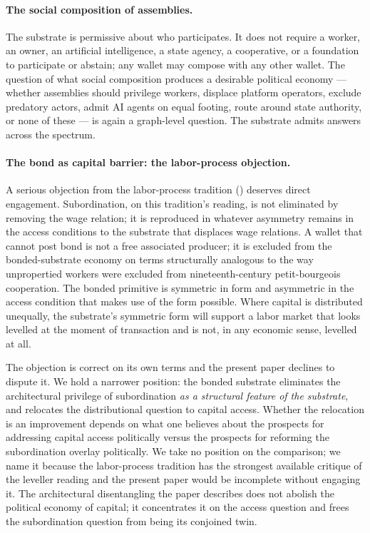 \documentclass[11pt,a4paper]{article}
\theoremstyle{remark}
\begin{document}
\paragraph{The social composition of assemblies.}
The substrate is permissive about who participates. It does not
require a worker, an owner, an artificial intelligence, a state
agency, a cooperative, or a foundation to participate or
abstain; any wallet may compose with any other wallet. The
question of what social composition produces a desirable
political economy --- whether assemblies should privilege
workers, displace platform operators, exclude predatory actors,
admit AI agents on equal footing, route around state authority,
or none of these --- is again a graph-level question. The
substrate admits answers across the spectrum.

\paragraph{The bond as capital barrier: the labor-process objection.}
A serious objection from the labor-process tradition
(\citealt{braverman1974labor, burawoy1979manufacturing}) deserves
direct engagement. Subordination, on this tradition's reading,
is not eliminated by removing the wage relation; it is reproduced
in whatever asymmetry remains in the access conditions to the
substrate that displaces wage relations. A wallet that cannot
post bond is not a free associated producer; it is excluded from
the bonded-substrate economy on terms structurally analogous to
the way unpropertied workers were excluded from
nineteenth-century petit-bourgeois cooperation. The bonded
primitive is symmetric in form and asymmetric in the access
condition that makes use of the form possible. Where capital is
distributed unequally, the substrate's symmetric form will
support a labor market that looks levelled at the moment of
transaction and is not, in any economic sense, levelled at all.

The objection is correct on its own terms and the present paper
declines to dispute it. We hold a narrower position: the bonded
substrate eliminates the architectural privilege of subordination
\emph{as a structural feature of the substrate}, and relocates
the distributional question to capital access. Whether the
relocation is an improvement depends on what one believes about
the prospects for addressing capital access politically versus
the prospects for reforming the subordination overlay
politically. We take no position on the comparison; we name it
because the labor-process tradition has the strongest available
critique of the leveller reading and the present paper would be
incomplete without engaging it. The architectural disentangling
the paper describes does not abolish the political economy of
capital; it concentrates it on the access question and frees the
subordination question from being its conjoined twin.
\end{document}
